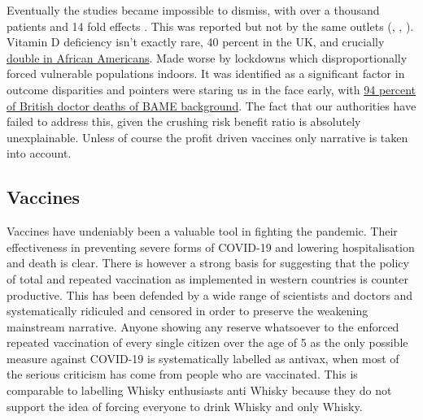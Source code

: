 \documentclass[11pt,a4paper]{article}
\begin{document}
Eventually the studies became impossible to dismiss, with over a thousand patients and 14 fold effects \cite{10.1371/journal.pone.0263069}. This was reported but not by the same outlets (\cite{timesofisrael03022022}, \cite{dailymail08022022}, \cite{hindustantimes14022022}). Vitamin D deficiency isn't exactly rare, 40 percent in the UK, and crucially \href{https://www.cooperinstitute.org/2019/09/24/african-americans-at-greatest-risk-of-vitamin-d-deficiency}{double in African Americans}. Made worse by lockdowns which disproportionally forced vulnerable populations indoors. It was identified as a significant factor in outcome disparities \cite{Ames2021-sf} and pointers were staring us in the face early, with \href{https://twitter.com/TheBMA/status/1271768163630428160?s=20}{94 percent of British doctor deaths of BAME background}. The fact that our authorities have failed to address this, given the crushing risk benefit ratio is absolutely unexplainable. Unless of course the profit driven vaccines only narrative is taken into account.

\subsection*{Vaccines}

Vaccines have undeniably been a valuable tool in fighting the pandemic. Their effectiveness in preventing severe forms of COVID-19 and lowering hospitalisation and death is clear. There is however a strong basis for suggesting that the policy of total and repeated vaccination as implemented in western countries is counter productive. This has been defended by a wide range of scientists and doctors and systematically ridiculed and censored in order to preserve the weakening mainstream narrative. Anyone showing any reserve whatsoever to the enforced repeated vaccination of every single citizen over the age of 5 as the only possible measure against COVID-19 is systematically labelled as antivax, when most of the serious criticism has come from people who are vaccinated. This is comparable to labelling Whisky enthusiasts anti Whisky because they do not support the idea of forcing everyone to drink Whisky and only Whisky.
\end{document}

